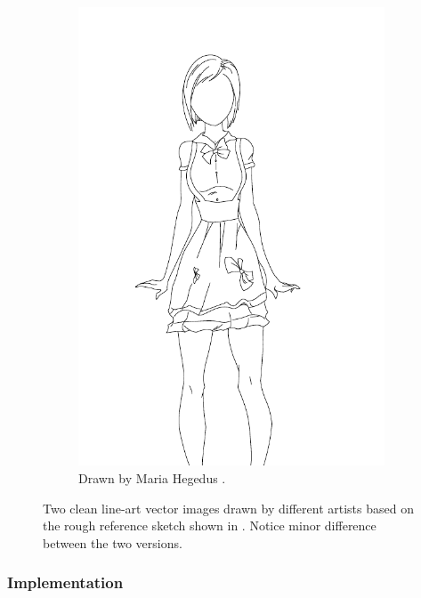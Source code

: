 \begin{figure}
\begin{subfigure}{.45\textwidth}
    \includegraphics[width=\textwidth]{graphics/sketchbench/sketchbench-black_Art_freeform_AG_03_Maria Hegedus_norm_cleaned.pdf}    
    \caption{Drawn by Maria Hegedus \citep{Yan:2020:ABR}.}
    \end{subfigure}
    \caption{Two clean line-art vector images drawn by different artists based on the rough reference sketch shown in . Notice minor difference between the two versions.}
    \label{fig:sketchbench.test.example}
\end{figure}


\subsubsection{Implementation}

